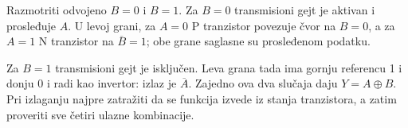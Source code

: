 Razmotriti odvojeno $B=0$ i $B=1$. Za $B=0$ transmisioni gejt je aktivan i prosleđuje $A$. U levoj grani, za $A=0$ P tranzistor povezuje čvor na $B=0$, a za $A=1$ N tranzistor na $\overline B=1$; obe grane saglasne su prosleđenom podatku.

Za $B=1$ transmisioni gejt je isključen. Leva grana tada ima gornju referencu 1 i donju 0 i radi kao invertor: izlaz je $\overline A$. Zajedno ova dva slučaja daju $Y=A\oplus B$. Pri izlaganju najpre zatražiti da se funkcija izvede iz stanja tranzistora, a zatim proveriti sve četiri ulazne kombinacije.
